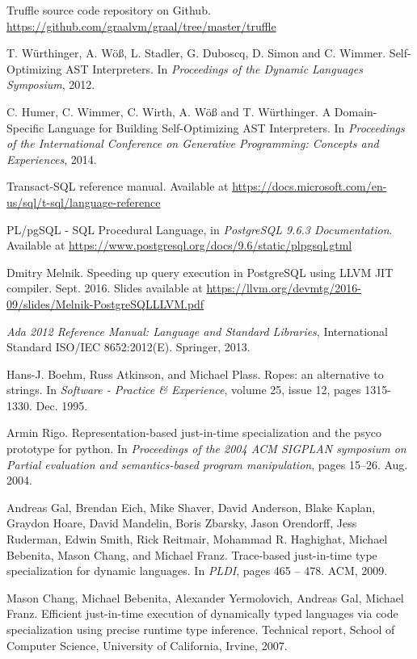 \documentclass[twoside,11pt,a4paper]{article}
\newcommand{\bibproceeding}[5]{
	\bibitem{#1}	%
		#2.		%
		#3.		%
		In \textit{#4},		%
		#5.		%
}
\newcommand{\biburl}[3] {
	\bibitem{#1}	%
		#2.\newline{}		%
		\url{#3}		%
}
\begin{document}
\begin{thebibliography}{99}
\biburl{trufflerepo}
	{Truffle source code repository on Github}
	{https://github.com/graalvm/graal/tree/master/truffle}

\bibproceeding{trufflespec}
	{T. Würthinger, A. Wö\ss, L. Stadler, G. Duboscq, D. Simon and C. Wimmer}
	{Self-Optimizing AST Interpreters}
	{Proceedings of the Dynamic Languages Symposium}
	{2012}

\bibproceeding{truffledsl}
	{C. Humer, C. Wimmer, C. Wirth, A. Wö\ss{} and T. Würthinger}
	{A Domain-Specific Language for Building Self-Optimizing AST Interpreters}
	{Proceedings of the International Conference on Generative Programming: Concepts and Experiences}
	{2014}

	Transact-SQL reference manual. Available at \url{https://docs.microsoft.com/en-us/sql/t-sql/language-reference}
	
	PL/pgSQL - SQL Procedural Language, in \textit{PostgreSQL 9.6.3 Documentation}. Available at \url{https://www.postgresql.org/docs/9.6/static/plpgsql.gtml}
	
	Dmitry Melnik. Speeding up query execution in PostgreSQL using LLVM JIT compiler. Sept. 2016. Slides available at \url{https://llvm.org/devmtg/2016-09/slides/Melnik-PostgreSQLLLVM.pdf}
	
	\textit{Ada 2012 Reference Manual: Language and Standard Libraries},
	International Standard ISO/IEC 8652:2012(E).
	Springer,
	2013.
	
	Hans-J. Boehm, Russ Atkinson, and Michael Plass.
	Ropes: an alternative to strings.
	In \textit{Software - Practice \& Experience}, volume 25, issue 12, pages 1315-1330.
	Dec. 1995.
	
\bibproceeding{psyco}
	{Armin Rigo}
	{Representation-based just-in-time specialization and the psyco prototype for python}
	{Proceedings of the 2004 ACM SIGPLAN symposium on Partial evaluation and semantics-based program manipulation}
	{pages 15–26. Aug. 2004}
	
\bibproceeding{gal}
	{Andreas  Gal,  Brendan  Eich,  Mike  Shaver,  David  Anderson,  Blake  Kaplan,  Graydon  Hoare,  David  Mandelin,  Boris Zbarsky, Jason Orendorff, Jess Ruderman, Edwin Smith, Rick Reitmair, Mohammad R. Haghighat, Michael Bebenita, Mason Chang, and Michael Franz}
	{Trace-based just-in-time type specialization for dynamic languages}
	{PLDI}
	{pages 465 – 478. ACM, 2009}
	
	Mason Chang, Michael Bebenita, Alexander Yermolovich, Andreas Gal, Michael Franz.
	Efficient just-in-time execution of dynamically typed languages via code specialization using precise runtime type inference.
	Technical report, School of Computer Science, University of California, Irvine, 2007.


\end{thebibliography}
\end{document}
